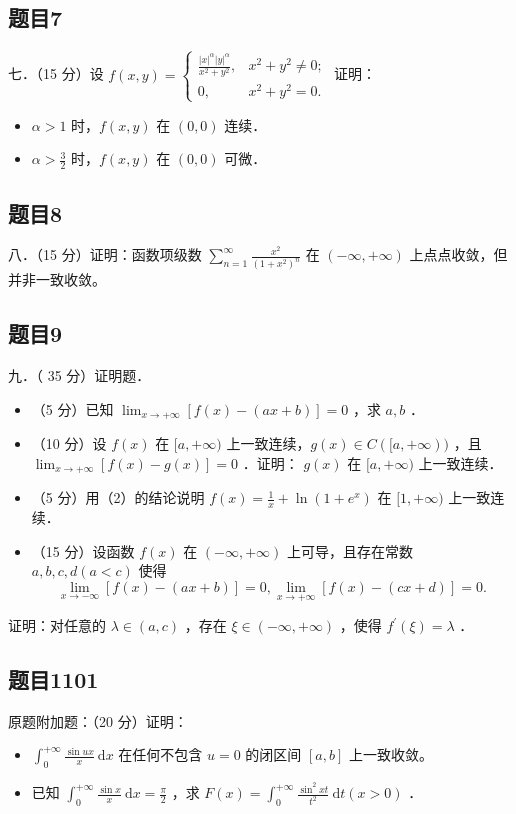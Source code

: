 \documentclass{article}
\begin{document}
\subsection{题目7}
七．（15 分）设 \(f(x, y)=\left\{\begin{array}{ll}\frac{|x|^{\alpha}|y|^{\alpha}}{x^{2}+y^{2}}, & x^{2}+y^{2} \neq 0 ; \\ 0, & x^{2}+y^{2}=0 .\end{array}\right.\) 证明：

\begin{itemize}
  \item[（1）] \(\alpha>1\) 时，\(f(x, y)\) 在 \((0,0)\) 连续．
  \item[（2）] \(\alpha>\frac{3}{2}\) 时，\(f(x, y)\) 在 \((0,0)\) 可微．
\end{itemize}

\subsection{题目8}
八．（15 分）证明：函数项级数 \(\sum_{n=1}^{\infty} \frac{x^{2}}{\left(1+x^{2}\right)^{n}}\) 在 \((-\infty,+\infty)\) 上点点收敛，但并非一致收敛。

\subsection{题目9}
九．（ 35 分）证明题．

\begin{itemize}
  \item[（1）] （5 分）已知 \(\lim _{x \rightarrow+\infty}[f(x)-(a x+b)]=0\) ，求 \(a, b\) ．
  \item[（2）] （10 分）设 \(f(x)\) 在 \([a,+\infty)\) 上一致连续，\(g(x) \in C([a,+\infty))\) ，且 \(\lim _{x \rightarrow+\infty}[f(x)-g(x)]=0\) ．证明： \(g(x)\) 在 \([a,+\infty)\) 上一致连续．
  \item[（3）] （5 分）用（2）的结论说明 \(f(x)=\frac{1}{x}+\ln \left(1+e^{x}\right)\) 在 \([1,+\infty)\) 上一致连续．
  \item[（4）] （15 分）设函数 \(f(x)\) 在 \((-\infty,+\infty)\) 上可导，且存在常数 \(a, b, c, d(a<c)\) 使得
\[
\lim _{x \rightarrow-\infty}[f(x)-(a x+b)]=0, \lim _{x \rightarrow+\infty}[f(x)-(c x+d)]=0 .
\]
\end{itemize}

证明：对任意的 \(\lambda \in(a, c)\) ，存在 \(\xi \in(-\infty,+\infty)\) ，使得 \(f^{\prime}(\xi)=\lambda\) ．

\subsection{题目1101}
原题附加题：（20 分）证明：

\begin{itemize}
  \item[（1）] \(\int_{0}^{+\infty} \frac{\sin u x}{x} \mathrm{~d} x\) 在任何不包含 \(u=0\) 的闭区间 \([a, b]\) 上一致收敛。
  \item[（2）] 已知 \(\int_{0}^{+\infty} \frac{\sin x}{x} \mathrm{~d} x=\frac{\pi}{2}\) ，求 \(F(x)=\int_{0}^{+\infty} \frac{\sin ^{2} x t}{t^{2}} \mathrm{~d} t(x>0)\) ．
\end{itemize}
\end{document}
